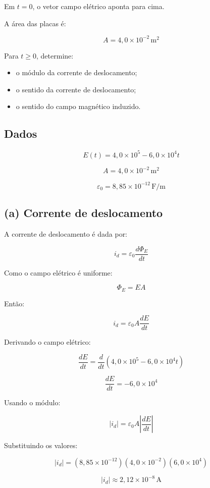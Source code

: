 \documentclass[12pt,a4paper]{article}
\begin{document}
Em $t=0$, o vetor campo elétrico aponta para cima.

A área das placas é:

\[
A = 4,0\times10^{-2}\,\text{m}^2
\]

Para $t \ge 0$, determine:

\begin{itemize}
    \item[(a)] o módulo da corrente de deslocamento;
    \item[(b)] o sentido da corrente de deslocamento;
    \item[(c)] o sentido do campo magnético induzido.
\end{itemize}

\subsection*{Dados}

\[
E(t)=4,0\times10^5-6,0\times10^4 t
\]

\[
A=4,0\times10^{-2}\,\text{m}^2
\]

\[
\varepsilon_0 = 8,85\times10^{-12}\,\text{F/m}
\]


\subsection*{(a) Corrente de deslocamento}

A corrente de deslocamento é dada por:

\[
i_d=\varepsilon_0\frac{d\Phi_E}{dt}
\]

Como o campo elétrico é uniforme:

\[
\Phi_E = EA
\]

Então:

\[
i_d=\varepsilon_0 A\frac{dE}{dt}
\]

Derivando o campo elétrico:

\[
\frac{dE}{dt}=
\frac{d}{dt}
\left(
4,0\times10^5-6,0\times10^4 t
\right)
\]

\[
\frac{dE}{dt}=-6,0\times10^4
\]

Usando o módulo:

\[
|i_d|=
\varepsilon_0 A
\left|
\frac{dE}{dt}
\right|
\]

Substituindo os valores:

\[
|i_d|=
(8,85\times10^{-12})
(4,0\times10^{-2})
(6,0\times10^4)
\]

\[
|i_d|\approx 2,12\times10^{-8}\,\text{A}
\]
\end{document}
